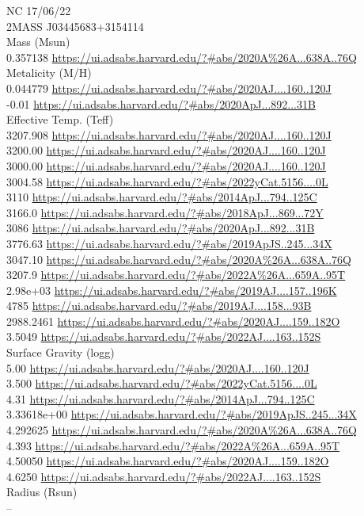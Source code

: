 NC 17/06/22\\
2MASS J03445683+3154114\\
Mass (Msun)\\
0.357138 \url{https://ui.adsabs.harvard.edu/?#abs/2020A%26A...638A..76Q}\\
Metalicity (M/H)\\
0.044779 \url{https://ui.adsabs.harvard.edu/?#abs/2020AJ....160..120J}\\
-0.01 \url{https://ui.adsabs.harvard.edu/?#abs/2020ApJ...892...31B}\\
Effective Temp. (Teff)\\
3207.908 \url{https://ui.adsabs.harvard.edu/?#abs/2020AJ....160..120J}\\
3200.00 \url{https://ui.adsabs.harvard.edu/?#abs/2020AJ....160..120J}\\
3000.00 \url{https://ui.adsabs.harvard.edu/?#abs/2020AJ....160..120J}\\
3004.58 \url{https://ui.adsabs.harvard.edu/?#abs/2022yCat.5156....0L}\\
3110 \url{https://ui.adsabs.harvard.edu/?#abs/2014ApJ...794..125C}\\
3166.0 \url{https://ui.adsabs.harvard.edu/?#abs/2018ApJ...869...72Y}\\
3086 \url{https://ui.adsabs.harvard.edu/?#abs/2020ApJ...892...31B}\\
3776.63 \url{https://ui.adsabs.harvard.edu/?#abs/2019ApJS..245...34X}\\
3047.10 \url{https://ui.adsabs.harvard.edu/?#abs/2020A%26A...638A..76Q}\\
3207.9 \url{https://ui.adsabs.harvard.edu/?#abs/2022A%26A...659A..95T}\\
2.98e+03 \url{https://ui.adsabs.harvard.edu/?#abs/2019AJ....157..196K}\\
4785 \url{https://ui.adsabs.harvard.edu/?#abs/2019AJ....158...93B}\\
2988.2461 \url{https://ui.adsabs.harvard.edu/?#abs/2020AJ....159..182O}\\
3.5049 \url{https://ui.adsabs.harvard.edu/?#abs/2022AJ....163..152S}\\
Surface Gravity (logg)\\
5.00 \url{https://ui.adsabs.harvard.edu/?#abs/2020AJ....160..120J}\\
3.500 \url{https://ui.adsabs.harvard.edu/?#abs/2022yCat.5156....0L}\\
4.31 \url{https://ui.adsabs.harvard.edu/?#abs/2014ApJ...794..125C}\\
3.33618e+00	\url{https://ui.adsabs.harvard.edu/?#abs/2019ApJS..245...34X}\\
4.292625 \url{https://ui.adsabs.harvard.edu/?#abs/2020A%26A...638A..76Q}\\
4.393 \url{https://ui.adsabs.harvard.edu/?#abs/2022A%26A...659A..95T}\\
4.50050 \url{https://ui.adsabs.harvard.edu/?#abs/2020AJ....159..182O}\\
4.6250 \url{https://ui.adsabs.harvard.edu/?#abs/2022AJ....163..152S}\\
Radius (Rsun)\\
--\\

